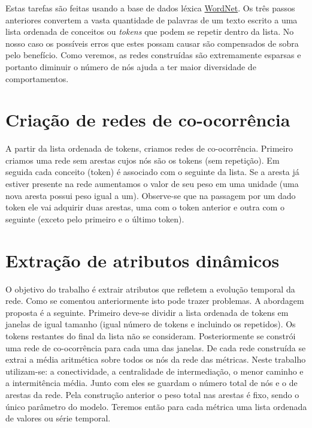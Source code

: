 \documentclass[a4paper,openright,12pt]{report} %
\begin{document}
Estas tarefas s\~ao feitas usando a base de dados l\'exica \href{http://wordnet.princeton.edu/}{WordNet}. 
Os tr\^es passos anteriores convertem a vasta quantidade de palavras de um texto escrito a uma lista ordenada de conceitos ou \textit{tokens} que podem se repetir dentro da lista. No nosso caso os poss\'iveis erros que estes possam causar s\~ao compensados de sobra pelo benef\'icio. Como veremos, as redes constru\'idas s\~ao extremamente esparsas e portanto diminuir o n\'umero de n\'os ajuda a ter maior diversidade de comportamentos.\\


\section{Cria\c c\~ao de redes de co-ocorr\^encia}

A partir da lista ordenada de tokens, criamos redes de co-ocorr\^encia. Primeiro criamos uma rede sem arestas cujos n\'os s\~ao os tokens (sem repeti\c c\~ao). Em seguida cada conceito (token) \'e associado com o seguinte da lista. Se a aresta j\'a estiver presente na rede aumentamos o valor de seu peso em uma unidade (uma nova aresta possui peso igual a um). Observe-se que na passagem por um dado token ele vai adquirir duas arestas, uma com o token anterior e outra com o seguinte (exceto pelo primeiro e o \'ultimo token).\\

\section{Extra\c c\~ao de atributos din\^amicos}

O objetivo do trabalho \'e extrair atributos que refletem a evolu\c c\~ao temporal da rede. Como se comentou anteriormente isto pode trazer problemas. A abordagem proposta \'e a seguinte. Primeiro deve-se dividir a lista ordenada de tokens em janelas de igual tamanho (igual n\'umero de tokens e incluindo os repetidos). Os tokens restantes do final da lista n\~ao se consideram. Posteriormente se constr\'oi uma rede de co-ocorr\^encia para cada uma das janelas. De cada rede constru\'ida se extrai a m\'edia aritm\'etica sobre todos os n\'os da rede das m\'etricas. Neste trabalho utilizam-se: a conectividade, a centralidade de intermedia\c c\~ao, o menor caminho e a intermit\^encia m\'edia. Junto com eles se guardam o n\'umero total de n\'os e o de arestas da rede. Pela constru\c c\~ao anterior o peso total nas arestas \'e fixo, sendo o \'unico par\^ametro do modelo. Teremos ent\~ao para cada m\'etrica uma lista ordenada de valores ou s\'erie temporal.\\
\end{document}
